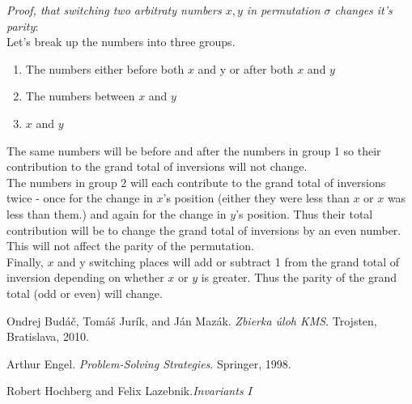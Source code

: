 \documentclass[11pt,a5paper]{article}
\begin{document}
\noindent\emph{Proof, that switching two arbitraty numbers $x, y$ in permutation $\sigma$ changes it's parity}:\\
Let's break up the numbers into three groups.
\begin{enumerate}
\item{The numbers either before both $x$ and y or after both $x$ and $y$}
\item{The numbers between $x$ and $y$}
\item{$x$ and $y$}
\end{enumerate}
The same numbers will be before and after the numbers in group 1 so their contribution to the grand total of inversions will not change. \\
The numbers in group 2 will each contribute to the grand total of inversions twice - once for the change in $x$'s position (either they were less than $x$ or $x$ was less than them.) and again for the change in $y$'s position. Thus their total contribution will be to change the grand total of inversions by an even number. This will not affect the parity of the permutation. \\
Finally, $x$ and y switching places will add or subtract 1 from the grand total of inversion depending on whether $x$ or $y$ is greater. Thus the parity of the grand total (odd or even) will change.


\begin{thebibliography}{9}
 Ondrej Budáč, Tomáš Jurík, and Ján Mazák. \emph{Zbierka úloh KMS}. Trojsten, Bratislava, 2010.

Arthur Engel. \emph{Problem-Solving Strategies}. Springer, 1998.

 Robert Hochberg and Felix Lazebnik.\emph{Invariants $I$}

\end{thebibliography}
\end{document}
